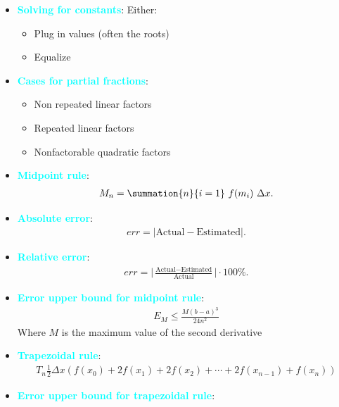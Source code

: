 \documentclass{report}
\begin{document}
\begin{itemize}
        \item \textbf{\textcolor{cyan}{Solving for constants}}:
            Either:
            \begin{itemize}
                \item Plug in values (often the roots)
                \item Equalize 
            \end{itemize}
        \item \textbf{\textcolor{cyan}{Cases for partial fractions}}:
            \begin{itemize}
                \item Non repeated linear factors
                \item Repeated linear factors
                \item Nonfactorable quadratic factors
            \end{itemize}
        \item \textbf{\textcolor{cyan}{Midpoint rule}}:
            \begin{align*}
                M_{n} = \summation{n}{i=1}\ f(m_{i})\ \Delta x 
            .\end{align*}
        \item \textbf{\textcolor{cyan}{Absolute error}}:
            \begin{align*}
                err = \bigg|\text{Actual} - \text{Estimated}\bigg|
            .\end{align*}
        \item \textbf{\textcolor{cyan}{Relative error}}:
            \begin{align*}
                err = \bigg|\frac{\text{Actual} - \text{Estimated}}{\text{Actual}}\bigg| \cdot 100\%
            .\end{align*}
        \item \textbf{\textcolor{cyan}{Error upper bound for midpoint rule}}:
            \begin{align*}
                E_{M} \leq \frac{M(b-a)^3}{24n^2}
            \end{align*}
            Where $M$ is the maximum value of the second derivative
        \item \textbf{\textcolor{cyan}{Trapezoidal rule}}:
            \begin{align*}
                T_n \frac{1}{2} \Delta x \left( f(x_0) + 2f(x_1) + 2f(x_2) + \cdots + 2f(x_{n-1}) + f(x_n) \right)
            \end{align*}
        \item \textbf{\textcolor{cyan}{Error upper bound for trapezoidal rule}}:

\end{itemize}
\end{document}
